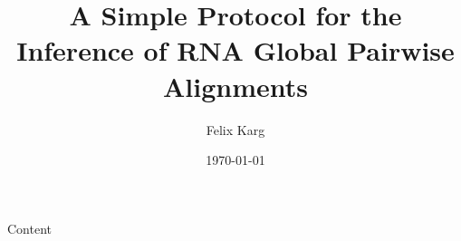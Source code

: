\documentclass[12pt,compress,ngerman,utf8,t,usenames,dvipsnames]{beamer}
\date{\today}
\institute{University of Freiburg}
\title{A Simple Protocol for the Inference of RNA Global Pairwise Alignments}
\author{Felix Karg}
\begin{document}
\maketitle



\begin{frame}{Content}
    \large
    \begin{multicols}{2}
        \tableofcontents[]
    \end{multicols}
\end{frame}


%










\setcounter{official}{\value{page}}

\end{document}
